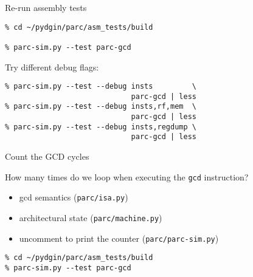 
\begin{task}
\begin{frame}[fragile]{Re-run assembly tests}

\begin{verbatim}
% cd ~/pydgin/parc/asm_tests/build

% parc-sim.py --test parc-gcd
\end{verbatim}

Try different debug flags:

\begin{verbatim}
% parc-sim.py --test --debug insts         \
                             parc-gcd | less
% parc-sim.py --test --debug insts,rf,mem  \
                             parc-gcd | less
% parc-sim.py --test --debug insts,regdump \
                             parc-gcd | less
\end{verbatim}

\end{frame}
\end{task}


\begin{task}
\begin{frame}[fragile]{Count the GCD cycles}

{}How many times do we loop when executing the \texttt{gcd} instruction?

\begin{itemize}
  \item gcd semantics (\texttt{parc/isa.py})
  \item architectural state (\texttt{parc/machine.py})
  \item uncomment to print the counter (\texttt{parc/parc-sim.py})
\end{itemize}

\begin{verbatim}
% cd ~/pydgin/parc/asm_tests/build
% parc-sim.py --test parc-gcd
\end{verbatim}

\end{frame}
\end{task}



